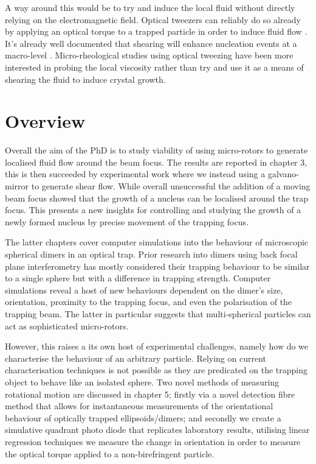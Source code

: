 A way around this would be to try and induce the local fluid 
without directly relying on the electromagnetic field. Optical 
tweezers can reliably do so already by applying an optical 
torque to a trapped particle in order to induce fluid flow 
\cite{Bishop2004, RobertsonAnderson2018}. It's already well
documented that shearing will enhance nucleation events at a
macro-level \cite{Debuysschere2023}. Micro-rheological studies 
using optical tweezing have been more interested in probing 
the local viscosity rather than try and use it as a means of 
shearing the fluid to induce crystal growth. 

\section{Overview}
Overall the aim of the PhD is to study viability of using 
micro-rotors to generate localised fluid flow around the 
beam focus. The results are reported in chapter 3, this is 
then succeeded by experimental work where we instead using 
a galvano-mirror to generate shear flow. While overall 
unsuccessful the addition of a moving beam focus showed 
that the growth of a nucleus can be localised around the 
trap focus. This presents a new insights for controlling
and studying the growth of a newly formed nucleus by 
precise movement of the trapping focus.

The latter chapters cover computer simulations into the 
behaviour of microscopic spherical dimers in an optical
trap. Prior research into dimers using back focal plane
interferometry has mostly considered their trapping 
behaviour to be similar to a single sphere but with a 
difference in trapping strength. Computer simulations
reveal a host of new behaviours dependent on the dimer's
size, orientation, proximity to the trapping focus, and 
even the polarisation of the trapping beam. The latter in
particular suggests that multi-spherical particles can act
as sophisticated micro-rotors. 

However, this raises a its own host of experimental challenges,
namely how do we characterise the behaviour of an arbitrary
particle. Relying on current characterisation techniques is not
possible as they are predicated on the trapping object to behave
like an isolated sphere. Two novel methods of measuring rotational 
motion are discussed in chapter 5; firstly via a novel detection 
fibre method that allows for instantaneous measurements of the 
orientational behaviour of optically trapped ellipsoids/dimers; 
and secondly we create a simulative quadrant photo diode that 
replicates laboratory results, utilising linear regression 
techniques we measure the change in orientation in order to 
measure the optical torque applied to a non-birefringent particle. 
